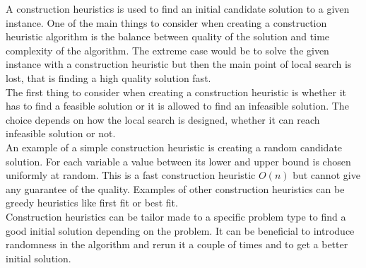 A construction heuristics is used to find an initial candidate solution to a given instance. One of the main things to 
consider when creating a construction heuristic algorithm is the balance between quality of the solution and time 
complexity of the algorithm. The extreme case would be to solve the given instance with a construction heuristic but 
then the main point of local search is lost, that is finding a high quality solution fast. \\ 
The first thing to consider when creating a construction heuristic is whether it has to find a feasible solution or it 
is allowed to find an infeasible solution. The choice depends on how the local search is designed, whether it can reach 
infeasible solution or not. \\ 
An example of a simple construction heuristic is creating a random candidate solution. For each variable a value 
between its lower and upper bound is chosen uniformly at random. This is a fast construction heuristic $O(n)$ but 
cannot give any guarantee of the quality. Examples of other construction heuristics can be greedy heuristics like first 
fit or best fit. \\ 
Construction heuristics can be tailor made to a specific problem type to find a good initial solution depending on the 
problem. It can be beneficial to introduce randomness in the algorithm and rerun it a couple of times and to get a 
better initial solution.